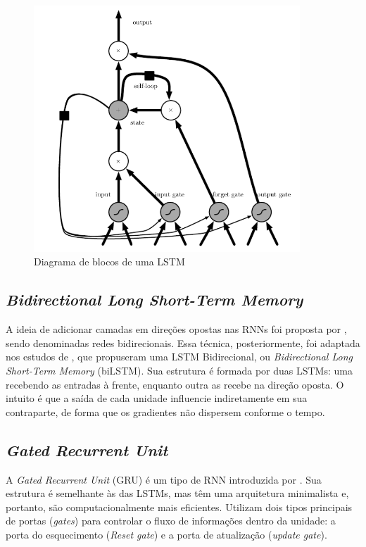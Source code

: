 \begin{figure}[!htb] \centering
  \caption{Diagrama de blocos de uma LSTM} \label{figura:lstm}
  \begin{varwidth}{\linewidth}
    \includegraphics[width=10cm]{figuras/lstm.png}
  \end{varwidth}
\end{figure}

\subsection{\textit{Bidirectional Long Short-Term Memory}} \label{sec:bilstm}

A ideia de adicionar camadas em direções opostas nas RNNs foi proposta por \textcite{Schuster}, sendo denominadas redes bidirecionais.
Essa técnica, posteriormente, foi adaptada nos estudos de \textcite{bilstm}, que propuseram uma LSTM Bidirecional, ou \textit{Bidirectional Long Short-Term Memory} (biLSTM).
Sua estrutura é formada por duas LSTMs: 
uma recebendo as entradas à frente, enquanto outra as recebe na direção oposta.
O intuito é que a saída de cada unidade influencie indiretamente em sua contraparte, de forma que os gradientes não dispersem conforme o tempo.


\subsection{\textit{Gated Recurrent Unit}} \label{sec:gru}
A \textit{Gated Recurrent Unit} (GRU) é um tipo de RNN introduzida por \textcite{Cho}.
Sua estrutura é semelhante às das LSTMs, mas têm uma arquitetura minimalista e, portanto, são computacionalmente mais eficientes. 
Utilizam dois tipos principais de portas (\textit{gates}) para controlar o fluxo de informações dentro da unidade: a porta do esquecimento (\textit{Reset gate}) e a porta de atualização (\textit{update gate}).

